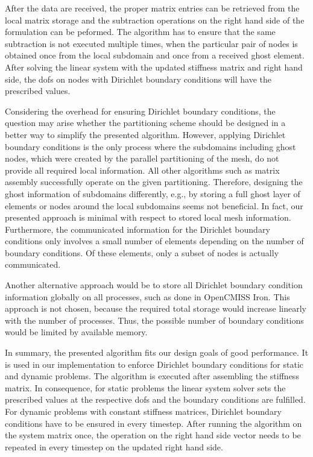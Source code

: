 After the data are received, the proper matrix entries can be retrieved from the local matrix storage and 
the subtraction operations on the right hand side of the formulation can be peformed. The algorithm has to ensure that the same subtraction is not executed multiple times, when the particular pair of nodes is obtained once from the local subdomain and once from a received ghost element.
After solving the linear system with the updated stiffness matrix and right hand side, the dofs on nodes with Dirichlet boundary conditions will have the prescribed values.

Considering the overhead for ensuring Dirichlet boundary conditions, the question may arise whether the partitioning scheme should be designed in a better way to simplify the presented algorithm.
However, applying Dirichlet boundary conditions is the only process where the subdomains including ghost nodes, which were created by the parallel partitioning of the mesh, do not provide all required local information. All other algorithms such as matrix assembly successfully operate on the given partitioning. 
Therefore, designing the ghost information of subdomains differently, e.g., by storing a full ghost layer of elements or nodes around the local subdomains seems not beneficial. In fact, our presented approach is minimal with respect to stored local mesh information. Furthermore, the communicated information for the Dirichlet boundary conditions only involves a small number of elements depending on the number of boundary conditions. Of these elements, only a subset of nodes is actually communicated.

Another alternative approach would be to store all Dirichlet boundary condition information globally on all processes, such as done in OpenCMISS Iron. This approach is not chosen, because the required total storage would increase linearly with the number of processes. Thus, the possible number of boundary conditions would be limited by available memory.

In summary, the presented algorithm fits our design goals of good performance. It is used in our implementation to enforce Dirichlet boundary conditions for static and dynamic problems. The algorithm is executed after assembling the stiffness matrix. In consequence, for static problems the linear system solver sets the prescribed values at the respective dofs and the boundary conditions are fulfilled. For dynamic problems with constant stiffness matrices, Dirichlet boundary conditions have to be ensured in every timestep. After running the algorithm on the system matrix once, the operation on the right hand side vector needs to be repeated in every timestep on the updated right hand side.


